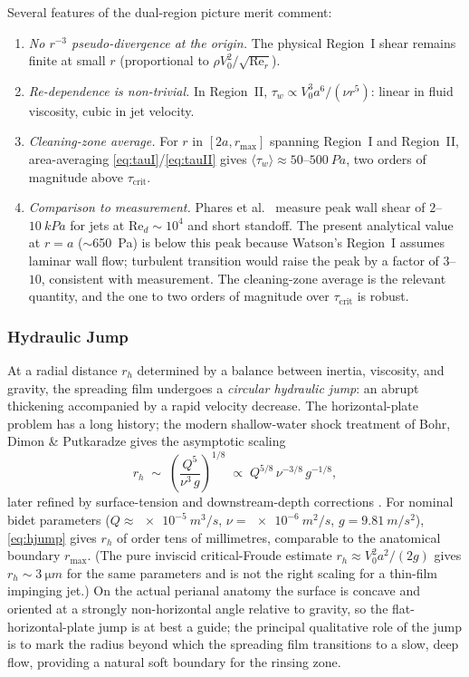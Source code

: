 \documentclass[aps,prfluids,reprint,amsmath,amssymb,floatfix]{revtex4-2}
\newcommand{\Rey}{\mathrm{Re}}
\begin{document}
Several features of the dual-region picture merit comment:
\begin{enumerate}[leftmargin=*, label=(\roman*)]
    \item \emph{No $r^{-3}$ pseudo-divergence at the origin.} The
    physical Region~I shear remains finite at small $r$
    (proportional to $\rho V_0^2/\sqrt{\Rey_r}$).
    \item \emph{Re-dependence is non-trivial.} In Region~II,
    $\tau_w \propto V_0^3 a^6/(\nu r^5)$: linear in fluid viscosity,
    cubic in jet velocity.
    \item \emph{Cleaning-zone average.} For $r$ in $[2a, r_\mathrm{max}]$
    spanning Region~I and Region~II, area-averaging
    \eqref{eq:tauI}/\eqref{eq:tauII} gives
    $\langle\tau_w\rangle \approx 50$--$\SI{500}{Pa}$, two orders of
    magnitude above $\tau_\mathrm{crit}$.
    \item \emph{Comparison to measurement.} Phares et al.~\citep{Phares2000}
    measure peak wall shear of $2$--$\SI{10}{kPa}$ for jets at $\Rey_d
    \sim 10^4$ and short standoff. The present analytical value at
    $r = a$ ($\sim$\SI{650}{Pa}) is below this peak because Watson's
    Region~I assumes laminar wall flow; turbulent transition would
    raise the peak by a factor of $3$--$10$, consistent with measurement.
    The cleaning-zone average is the relevant quantity, and the
    one to two orders of magnitude over $\tau_\mathrm{crit}$ is robust.
\end{enumerate}

\subsubsection{Hydraulic Jump}

At a radial distance $r_h$ determined by a balance between inertia,
viscosity, and gravity, the spreading film undergoes a \emph{circular
hydraulic jump}: an abrupt thickening accompanied by a rapid velocity
decrease. The horizontal-plate problem has a long history; the modern
shallow-water shock treatment of Bohr, Dimon \& Putkaradze
\citep{BohrEtAl1993} gives the asymptotic scaling
\begin{equation}
    r_h \;\sim\; \left(\frac{Q^5}{\nu^3\,g}\right)^{1/8}
    \;\propto\; Q^{5/8}\,\nu^{-3/8}\,g^{-1/8},
    \label{eq:hjump}
\end{equation}
later refined by surface-tension and downstream-depth corrections
\citep{BushAristoff2003}. For nominal bidet parameters
($Q \approx \SI{e-5}{m^3/s}$, $\nu = \SI{e-6}{m^2/s}$,
$g = \SI{9.81}{m/s^2}$), \eqref{eq:hjump} gives $r_h$ of order tens of
millimetres, comparable to the anatomical boundary $r_\mathrm{max}$.
(The pure inviscid critical-Froude estimate $r_h \approx V_0^2 a^2/(2g)$
gives $r_h \sim \SI{3}{\micro m}$ for the same parameters and is not the
right scaling for a thin-film impinging jet.)
On the actual perianal anatomy the surface is concave and
oriented at a strongly non-horizontal angle relative to gravity, so
the flat-horizontal-plate jump is at best a guide; the principal
qualitative role of the jump is to mark the radius beyond which the
spreading film transitions to a slow, deep flow, providing a natural
soft boundary for the rinsing zone.
\end{document}
